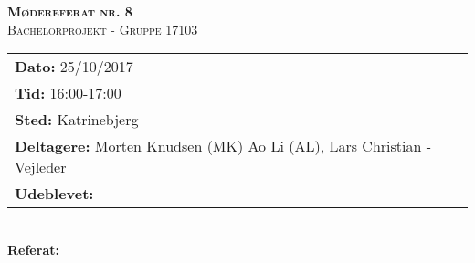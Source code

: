 
\newcommand{\HRule}{\rule{\linewidth}{0.1mm}}


	\begin{center}
		{\huge \bfseries \textsc{Mødereferat nr. 8}}\\
		\textsc{\large Bachelorprojekt - Gruppe 17103}\\[0.3cm]
	\end{center}
	\begin{tabular}{ll}
	\large \textbf{Dato:} 25/10/2017  	\\ %
	\large \textbf{Tid:}  16:00-17:00 	\\ %
	\large \textbf{Sted:} Katrinebjerg		\\ %
	\large \textbf{Deltagere:} Morten Knudsen (MK) Ao Li (AL), Lars Christian - Vejleder \\
	\large \textbf{Udeblevet:} 
	\end{tabular}\\
	\phantom{\,}\hspace{0.1em} \large \textbf{Referat:}

